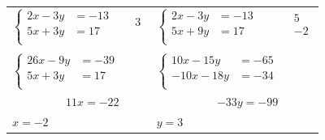\begin{tabular}{lp{3cm}ll}
\begin{minipage}{3cm}
$\begin{cases}
   2x -3y\!\!\!\!\!\!\!\! &= -13\\
   5x +3y\!\!\!\!\!\!\!\!&= 17\\
\end{cases}$ 
\end{minipage}  &  \multicolumn{1}{|l}{$\begin{array}{l}
                     3\\ ~ \\ 
                  \end{array}$ } & 
                   \begin{minipage}{3cm}
                   $\begin{cases}
                         2x -3y\!\!\!\!\!\!\!\!&= -13\\
                         5x +9y\!\!\!\!\!\!\!\!&= 17 \\
                   \end{cases} $ 
                \end{minipage} &  \multicolumn{1}{|l}{ $\begin{array}{l}
                                        5\\-2\\ 
                                  \end{array}$}\\
& & & \\
\begin{minipage}{3cm}
$\begin{cases}
   26x -9y \!\!\!\!\!\!\!\!&= -39\\
   5x +3y\!\!\!\!\!\!\!\!&= 17\\
\end{cases}$ 
\end{minipage}  &  & 
                   \begin{minipage}{3cm}
                   $\begin{cases}
                         10x -15y\!\!\!\!\!\!\!\!&= -65\\
                         -10x -18y\!\!\!\!\!\!\!\!&= -34 \\
                   \end{cases} $ 
                \end{minipage} &  \\
\cline{1-1} \cline{3-3}
\multicolumn{1}{r}{$11x = -22 $ } && \multicolumn{1}{r}{$-33y=-99$} & \\
$x=-2$ && $y=3$ & \\
\end{tabular}\\

